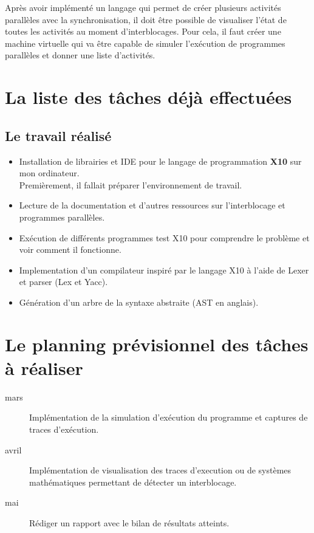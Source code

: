 \documentclass[12pt]{scrartcl}
\begin{document}
 Après avoir implémenté un langage qui permet de créer plusieurs activités parallèles avec la synchronisation, il doit être possible de visualiser l'état de toutes les activités au moment d'interblocages.
 Pour cela, il faut créer une machine virtuelle qui va être capable de simuler l'exécution de programmes parallèles et donner une liste d'activités. \\

 \newpage
\section{La liste des tâches déjà effectuées}

\subsection{Le travail réalisé}
\begin{itemize}
 \item Installation de librairies et IDE pour le langage de programmation \textbf{X10} sur mon ordinateur.\\ Premièrement, il fallait préparer l'environnement de travail.
 \item Lecture de la documentation et d'autres ressources sur l'interblocage et programmes parallèles.
 \item Exécution de différents programmes test X10 pour comprendre le problème et voir comment il fonctionne. 
 \item Implementation d'un compilateur inspiré par le langage X10 à l'aide de Lexer et parser (Lex et Yacc).
 \item Génération d'un arbre de la syntaxe abstraite (AST en anglais).
\end{itemize}


\section{Le planning prévisionnel des tâches à réaliser}
\begin{description}
  \item[mars] Implémentation de la simulation d'exécution du programme et captures de traces d'exécution.
  \item[avril] Implémentation de visualisation des traces d'execution ou de systèmes mathématiques permettant de détecter un interblocage.
  \item[mai] Rédiger un rapport avec le bilan de résultats atteints.
\end{description}
\end{document}
